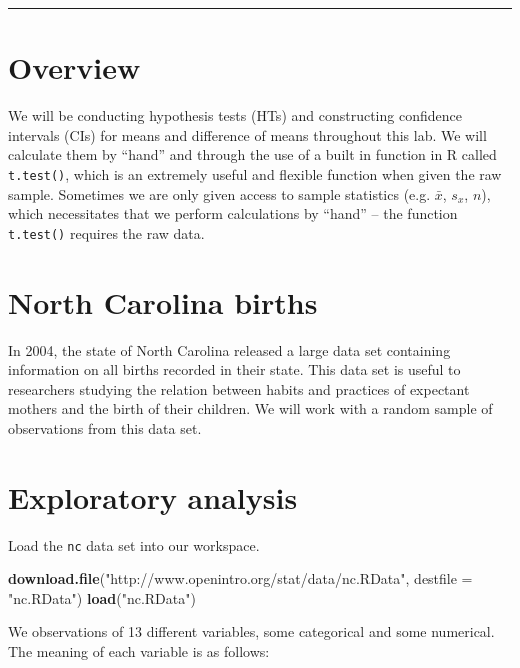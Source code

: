 \documentclass[]{book}
\newenvironment{Shaded}{\begin{snugshade}}{\end{snugshade}}
\newcommand{\KeywordTok}[1]{\textcolor[rgb]{0.13,0.29,0.53}{\textbf{{#1}}}}
\newcommand{\DataTypeTok}[1]{\textcolor[rgb]{0.13,0.29,0.53}{{#1}}}
\newcommand{\StringTok}[1]{\textcolor[rgb]{0.31,0.60,0.02}{{#1}}}
\newcommand{\NormalTok}[1]{{#1}}
\theoremstyle{definition}
\theoremstyle{definition}
\theoremstyle{definition}
\theoremstyle{remark}
\begin{document}
\begin{center}\rule{0.5\linewidth}{\linethickness}\end{center}

\section{Overview}\label{overview}

We will be conducting hypothesis tests (HTs) and constructing confidence
intervals (CIs) for means and difference of means throughout this lab.
We will calculate them by ``hand'' and through the use of a built in
function in R called \texttt{t.test()}, which is an extremely useful and
flexible function when given the raw sample. Sometimes we are only given
access to sample statistics (e.g. \(\bar{x}\), \(s_x\), \(n\)), which
necessitates that we perform calculations by ``hand'' -- the function
\texttt{t.test()} requires the raw data.

\section{North Carolina births}\label{north-carolina-births}

In 2004, the state of North Carolina released a large data set
containing information on all births recorded in their state. This data
set is useful to researchers studying the relation between habits and
practices of expectant mothers and the birth of their children. We will
work with a random sample of observations from this data set.

\section{Exploratory analysis}\label{exploratory-analysis}

Load the \texttt{nc} data set into our workspace.

\begin{Shaded}
\begin{Highlighting}[]
\KeywordTok{download.file}\NormalTok{(}\StringTok{"http://www.openintro.org/stat/data/nc.RData"}\NormalTok{, }\DataTypeTok{destfile =} \StringTok{"nc.RData"}\NormalTok{)}
\KeywordTok{load}\NormalTok{(}\StringTok{"nc.RData"}\NormalTok{)}
\end{Highlighting}
\end{Shaded}

We observations of 13 different variables, some categorical and some
numerical. The meaning of each variable is as follows:
\end{document}

